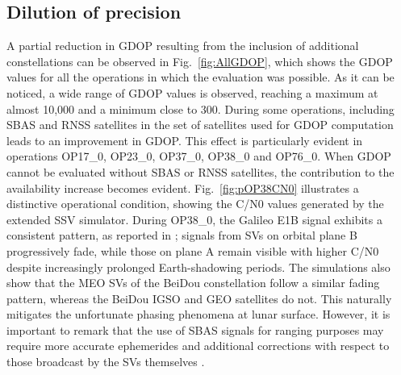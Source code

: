 \documentclass{IEEEtaes}
\begin{document}
\subsection{Dilution of precision}
A partial reduction in \gls{GDOP} resulting from the inclusion of additional constellations can be observed in Fig.~\ref{fig:AllGDOP}, which shows the \gls{GDOP} values for all the operations in which the evaluation was possible. As it can be noticed, a wide range of \gls{GDOP} values is observed, reaching a maximum at almost 10,000 and a minimum close to 300. During some operations, including \gls{SBAS} and \gls{RNSS} satellites in the set of satellites used for \gls{GDOP} computation leads to an improvement in \gls{GDOP}. This effect is particularly evident in operations  OP17\_0, OP23\_0, OP37\_0, OP38\_0 and OP76\_0. When GDOP cannot be evaluated without SBAS or RNSS satellites, the contribution to the availability increase becomes evident.
Fig.~\ref{fig:pOP38CN0} illustrates a distinctive operational condition, showing the \gls{C/N0} values generated by the extended \gls{SSV} simulator. During OP38\_0, the Galileo E1B signal exhibits a consistent pattern, as reported in \cite{JournalDiMissione}; signals from \glspl{SV} on orbital plane B progressively fade, while those on plane A remain visible with higher \gls{C/N0} despite increasingly prolonged Earth-shadowing periods. The simulations also show that the \gls{MEO} \glspl{SV} of the BeiDou constellation follow a similar fading pattern, whereas the BeiDou \gls{IGSO} and \gls{GEO} satellites do not. This naturally mitigates the unfortunate phasing phenomena at lunar surface. However, it is important to remark that the use of \gls{SBAS} signals for ranging purposes may require more accurate ephemerides and additional corrections with respect to those broadcast by the \glspl{SV} themselves \cite{kahr2016analysis}.
\end{document}
